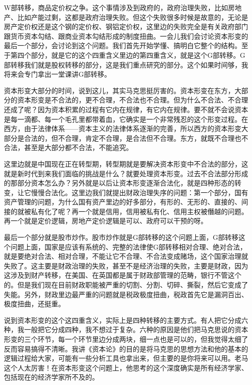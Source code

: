 \documentclass[UTF8, 12pt, a4paper]{ctexrep}
\begin{document}
W部转移，商品定价权之争。这个事情涉及到政府的，政府治理失败，比如房地产、比如产能过剩，这都是政府治理失败。但这个失败很多时候是故意的，无论是房产定价权还是这个钢的定价权、钢铝定价权，这里边的失败完全是有关政府部门跟货币资本勾结、跟商业资本勾结形成的制度扭曲。一会儿我们会讨论资本形变的最后一个部分，会讨论到这个问题。我们首先开始学懂、搞明白它整个的结构。至于第四个部分，就是它的这个四重含义里边的第四重含义，就是这个G部转移。G部转移我们就是股权转移的部分，这是我们重点研究的部分。这个如果时间够，我将来会专门拿出一堂课讲G部转移。

资本形变大部分的时间，说到这儿，其实马克思挺厉害的。资本形变在东方，大部分的资本形变是不合法的，更不合理，不合法也不合理。但为什么不合法、不合理还成了呢？因为资本积累的过程有它内在规律，有它内在规律。要不就不会说资本是每一滴都、每一个毛孔里都带着血，它确实是一个非常残忍的这个形变过程。在西方，由于法律体系——资本主义的法律体系逐渐的完善，所以西方的资本形变大部分是合法的，但不合理，肯定不合理，是合法但不合理。东方，就既不合理也不合法，甚至是大部分都不合法，不能追究。

这里边就是中国现在正在转型期，转型期就是要解决资本形变中不合法的部分，这就是新时代到来我们面临的挑战是什么？就要处理资本形变。过去不合法部分形成的那部分资本怎么办？另外就是以后让资本形变逐渐合法化，就是四种形态的转变，让它慢慢合法化。这里边我们就提出财政治理失序的问题：第一个部分，国有资产管理的问题，为什么国有资产里边的好多部分，有形的、无形的、直接的、间接的就被私有化了呢？再一个就是信用，信用被私有化、信用主权被僭越的问题。再一个就是定价逻辑，房地产定价逻辑是可以、政府可以干预的呀。

最后一个部分就是股市炒作。股市炒作就是G部转移的这个问题上面，G部转移这个问题上面，国家是应该有系统的、完整的法律使G部转移相对合理、绝对合法，就是要绝对合法、相对合理，不能让它不合理、不合法变成赌场，这个国家治理就失败了。这主要是财政治理的失败，甚至不是经济治理的失败，主要是财政，因为这涉及到财产转移，在美国、在英国都是属于财政部管理的范畴，银行不管这个的。但是我们现在目前财政职能被严重的切割、分割、切碎、撕裂，然后它变成了失能。另外，财政里边最严重的问题就是税政极度扭曲，税政首先它是漏洞百出、极度扭曲，还挺重。

说到资本形变的这个这四重含义，实际上是四种转移的主要方式。有人把它分成六种，我一般把它分成四种，我不想过于复杂。六种的原因是他们把马克思说的资本形变的三个环节，每一个环节里边分成两块，细一点也是可以的，但我觉得太细了反而容易搞得不清晰。我讲《资本论》的目的是将马克思的思想方法和他的基本的逻辑过程给大家，可能有一些分析工具也拿出来，但主要的是你将来可以用。老马这个人太厉害！在资本形变这个问题上，他思考的这个深度确实是所有经济学家、包括现在的经济学家所不及的。
\end{document}
